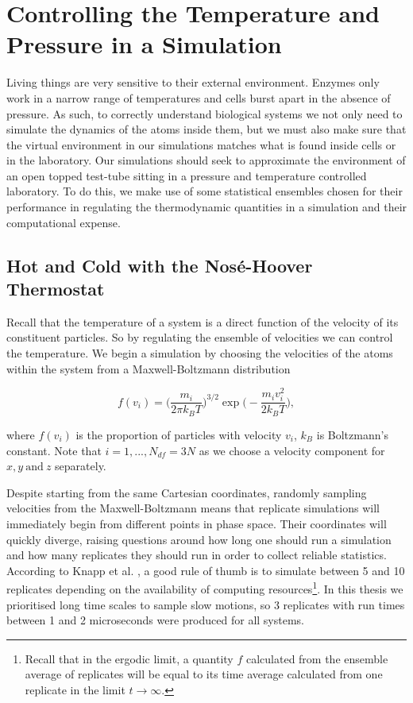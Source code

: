 \section{Controlling the Temperature and Pressure in a Simulation}
Living things are very sensitive to their external environment. Enzymes only work in a narrow range of temperatures and cells burst apart in the absence of pressure\cite{peterson2007}\cite{song2012}. As such, to correctly understand biological systems we not only need to simulate the dynamics of the atoms inside them, but we must also make sure that the virtual environment in our simulations matches what is found inside cells or in the laboratory. Our simulations should seek to approximate the environment of an open topped test-tube sitting in a pressure and temperature controlled laboratory. To do this, we make use of some statistical ensembles chosen for their performance in regulating the thermodynamic quantities in a simulation and their computational expense.  


\subsection{Hot and Cold with the Nos\'e-Hoover Thermostat}
Recall that the temperature of a system is a direct function of the velocity of its constituent particles. So by regulating the ensemble of velocities we can control the temperature. We begin a simulation by choosing the velocities of the atoms within the system from a Maxwell-Boltzmann distribution 

\begin{equation}
	f(v_i) = \Big(\frac{m_i}{2\pi k_B T}\Big)^{3/2} \exp{\Big(-\frac{m_iv_i^2}{2k_BT}\Big)},
\end{equation}

where $f(v_i)$ is the proportion of particles with velocity $v_i$, $k_B$ is Boltzmann's constant. Note that $i=1,...,N_{df}=3N$ as we choose a velocity component for $x,y \ \text{and}\  z$ separately. 

Despite starting from the same Cartesian coordinates, randomly sampling velocities from the Maxwell-Boltzmann means that replicate simulations will immediately begin from different points in phase space. Their coordinates will quickly diverge, raising questions around how long one should run a simulation and how many replicates they should run in order to collect reliable statistics. According to Knapp et al. \cite{knapp2018}, a good rule of thumb is to simulate between 5 and 10 replicates depending on the availability of computing resources\footnote{Recall that in the ergodic limit, a quantity $f$ calculated from the ensemble average of replicates will be equal to its time average calculated from one replicate in the limit $t\to\infty.$}. In this thesis we prioritised long time scales to sample slow motions, so 3 replicates with run times between 1 and 2 microseconds were produced for all systems. 

